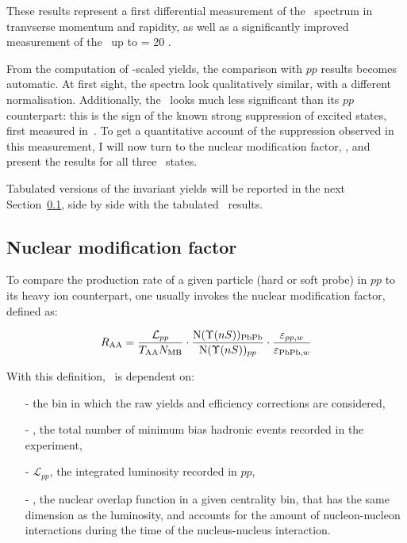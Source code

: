 These results represent a first differential measurement of the \PgUb\ spectrum
in tranvserse momentum and rapidity, as well as a significantly
improved measurement of the \PgUa\ up to \pt = 20 \GeVc.


From the computation of \TAA-scaled yields, the comparison with $pp$
results becomes automatic. At first sight, the spectra look
qualitatively similar, with a different normalisation. Additionally, the \PgUb\ looks much less
significant than its $pp$ counterpart: this is the sign of the
known strong suppression of excited states, first measured
in~\cite{HIN-11-007}. To get a quantitative account of the suppression
observed in this measurement, I will now turn to the nuclear
modification factor, \RAA, and present the results for all three \PgU\ states.

Tabulated versions of the invariant yields
will be reported in the next Section~\ref{subsec:raa}, side by side with the tabulated
\RAA\ results.

\subsection{Nuclear modification factor}
\label{subsec:raa}
To compare the production rate of a given particle (hard or soft
probe) in $pp$ to its heavy ion counterpart, one usually invokes the
nuclear modification factor, defined as:

\begin{equation}
  R_{\rm AA} = \frac{\mathcal{L}_{pp}}{T_{\rm AA}N_{\rm MB}} \cdot
  \frac{\textrm{N}(\Upsilon(nS))_{\textrm{PbPb}}}{\textrm{N}(\Upsilon(nS))_{pp}} \cdot
  \frac{\varepsilon_{pp, w}}{\varepsilon_{\textrm{PbPb}, w}} 
  \label{eq:raa2}
\end{equation}  

With this definition, \RAA\ is dependent on:
\begin{itemize}
\item[-] the bin in which the raw yields and efficiency corrections
  are considered,
\item[-] \NMB, the total number of minimum bias hadronic events
  recorded in the experiment,
\item[-] $\mathcal{L}_{pp}$, the integrated luminosity recorded in
  $pp$,
\item[-] \TAA, the nuclear overlap function in a given centrality bin, that has the same
  dimension as the luminosity, and accounts for the amount of
  nucleon-nucleon interactions during the time of
  the nucleus-nucleus interaction.
\end{itemize}

